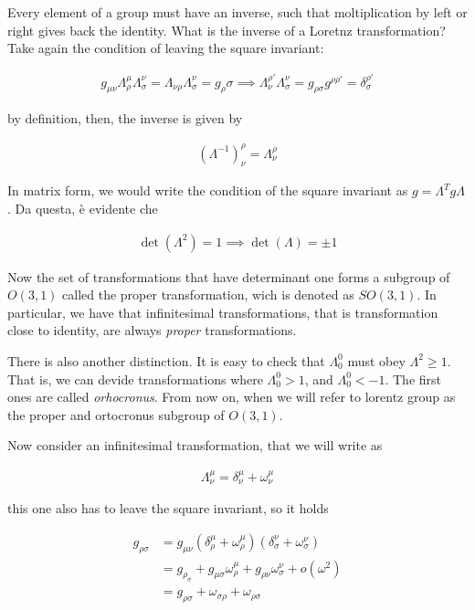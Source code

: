 \documentclass{report}
\begin{document}
Every element of a group must have an inverse, such that moltiplication by left or right gives back the identity. What is the inverse of a Loretnz transformation? Take again the condition of leaving the square invariant: 

\begin{align}
    g_{\mu\nu} \Lambda^\mu_\rho \Lambda^\nu_\sigma = \Lambda_{\nu\rho} \Lambda ^\nu_\sigma = g_\rho \sigma \implies \Lambda_\nu^{\rho'} \Lambda^\nu_\sigma = g_{\rho\sigma}g^{\rho\rho'} = \delta_\sigma^{\rho'}
\end{align}

by definition, then, the inverse is given by 

\begin{align}
    (\Lambda^{-1})^\rho_\nu = \Lambda^\rho_\nu
\end{align}

In matrix form, we would write the condition of the square invariant as \(g = \Lambda ^T g \Lambda\). Da questa, è evidente che 

\begin{align}
    \det(\Lambda^2) = 1 \implies \det(\Lambda) = \pm 1 
\end{align}

Now the set of transformations that have determinant one forms a subgroup of \(O(3, 1)\) called the proper transformation, wich is denoted as \(SO(3, 1)\). In particular, we have that infinitesimal transformations, that is transformation close to identity, are always \emph{proper} transformations. 

There is also another distinction. It is easy to check that \(\Lambda^0_0\) must obey \(\Lambda^2 \geq 1\). That is, we can devide transformations where \(\Lambda^0_0 > 1\), and \(\Lambda^0_0 < -1\). The first ones are called \emph{orhocronus}. From now on, when we will refer to lorentz group as the proper and ortocronus subgroup of \(O(3,1)\). 

Now consider an infinitesimal transformation, that we will write as 

\begin{align}
    \Lambda^\mu_\nu = \delta^\mu_\nu + \omega^\mu_\nu
\end{align}

this one also has to leave the square invariant, so it holds

\begin{align}
    g_{\rho\sigma} &= g_{\mu\nu}(\delta^\mu_\rho + \omega^\mu_\rho)(\delta^\nu_\sigma + \omega^\nu_\sigma) \\
    &= g_{\rho_\sigma} + g_{\mu\sigma}\omega^\mu_\rho + g_{\rho\nu}\omega^\nu_\sigma + o(\omega^2) \\
    &= g_{\rho\sigma} + \omega_{\sigma\rho} + \omega_{\rho\sigma}
\end{align}
\end{document}
